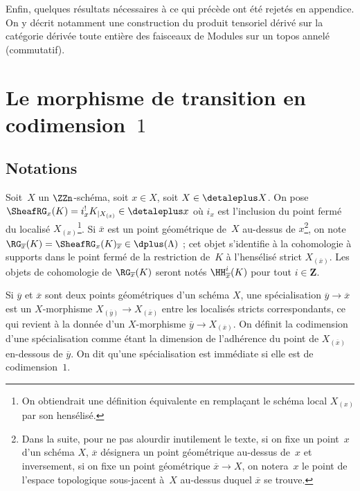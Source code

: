 \documentclass[10pt]{../fichiers-configuration-latex/smfart}
\begin{document}
Enfin, quelques résultats nécessaires à ce qui précède ont été rejetés en
appendice. On y décrit notamment une construction du produit tensoriel
dérivé sur la catégorie dérivée toute entière des faisceaux de Modules sur
un topos annelé (commutatif).

\section{Le morphisme de transition en \texorpdfstring{codimension~$1$}{codimension 1}}%
\label{17-section-transition-codimension-un}
\subsection{Notations}%

\begin{definition2}
Soit $X$ un $\ZZn$-schéma, soit $x\in X$, soit $X\in \detaleplus X$. On pose
$\SheafRG_x(K)=i_x^! K_{|X_{(x)}}\in \detaleplus x$ où $i_x$ est
l'inclusion du point fermé du localisé $X_{(x)}$\;\footnote{On obtiendrait
une définition équivalente en remplaçant le schéma local $X_{(x)}$ par son
hensélisé.}. Si $\overline x$ est un point géométrique de $X$ au-dessus de
$x$\;\footnote{Dans la suite, pour ne pas alourdir inutilement le texte, si
on fixe un point $x$ d'un schéma $X$, $\overline x$ désignera un point
géométrique au-dessus de $x$ et inversement, si on fixe un point
géométrique $\overline x\to X$, on notera $x$ le point de l'espace
topologique sous-jacent à $X$ au-dessus duquel $\overline x$ se trouve.},
on note $\RG_{\overline
x}(K)=\SheafRG_x(K)_{\overline x}\in \dplus(\Lambda)$ ; cet objet
s'identifie à la cohomologie à supports dans le point fermé de la
restriction de $K$ à l'hensélisé strict $X_{(\overline x)}$. Les objets de
cohomologie de $\RG_{\overline x}(K)$ seront notés $\HH^i_{\overline
x}(K)$ pour tout $i\in\mathbf{Z}$.
\end{definition2}

\begin{definition2}
Si $\overline y$ et
$\overline x$ sont deux points géométriques d'un schéma $X$, une
spécialisation $\overline y\to \overline x$ est un $X$-morphisme
$X_{(\overline y)}\to X_{(\overline x)}$ entre les localisés stricts
correspondants, ce qui revient à la donnée d'un $X$-morphisme $\overline
y\to X_{(\overline x)}$. On définit la codimension d'une spécialisation
comme étant la dimension de l'adhérence du point de $X_{(\overline x)}$
en-dessous de $\overline y$. On dit qu'une spécialisation est immédiate si
elle est de codimension $1$.
\end{definition2}
\end{document}
